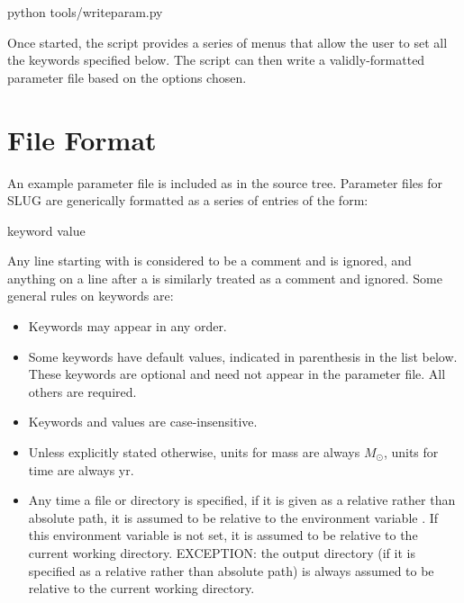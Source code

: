 \documentclass[letterpaper,10pt,english]{sphinxmanual}
\begin{document}
\begin{sphinxVerbatim}[commandchars=\\\{\}]
python tools/write\PYGZus{}param.py
\end{sphinxVerbatim}

Once started, the script provides a series of menus that allow the user to set all the keywords specified below. The script can then write a validly-formatted parameter file based on the options chosen.


\section{File Format}
\label{\detokenize{parameters:file-format}}
An example parameter file is included as  in the source tree. Parameter files for SLUG are generically formatted as a series of entries of the form:

\begin{sphinxVerbatim}[commandchars=\\\{\}]
keyword    value
\end{sphinxVerbatim}

Any line starting with \sphinxcode{\#} is considered to be a comment and is ignored, and anything on a line after a \sphinxcode{\#} is similarly treated as a comment and ignored. Some general rules on keywords are:
\begin{itemize}
\item {} 
Keywords may appear in any order.

\item {} 
Some keywords have default values, indicated in parenthesis in the list below. These keywords are optional and need not appear in the parameter file. All others are required.

\item {} 
Keywords and values are case-insensitive.

\item {} 
Unless explicitly stated otherwise, units for mass are always \(M_\odot\), units for time are always yr.

\item {} 
Any time a file or directory is specified, if it is given as a relative rather than absolute path, it is assumed to be relative to the environment variable . If this environment variable is not set, it is assumed to be relative to the current working directory. EXCEPTION: the output directory (if it is specified as a relative rather than absolute path) is always assumed to be relative to the current working directory.

\end{itemize}
\end{document}
